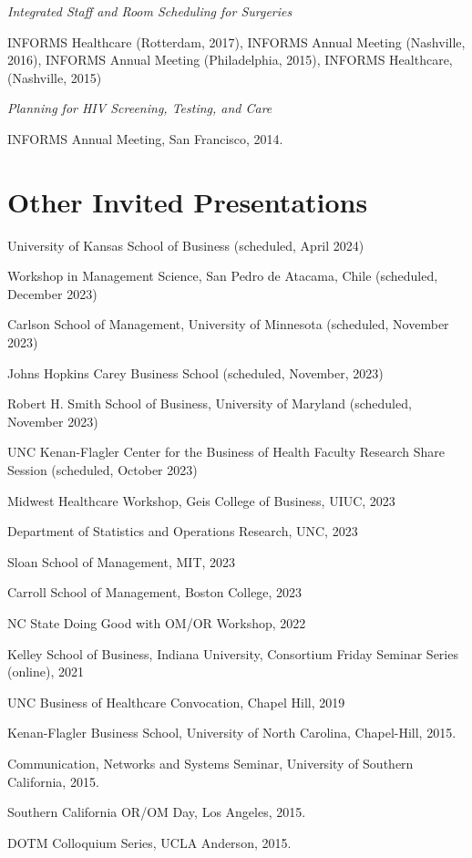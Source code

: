 \documentclass[11pt,a4paper]{article}
\renewenvironment{itemize}{
	\begin{list}{}{
			\setlength{\leftmargin}{1.5em}
		}
	}{
\end{list}
}
\begin{document}
\begin{itemize}
\begin{itemize}
		\end{itemize}
		\item \emph{Integrated Staff and Room Scheduling for Surgeries}
		\begin{itemize}
			\item INFORMS Healthcare (Rotterdam, 2017), INFORMS Annual Meeting (Nashville, 2016), INFORMS Annual Meeting (Philadelphia, 2015), INFORMS Healthcare, (Nashville, 2015)
		\end{itemize}
		\item \emph{Planning for HIV Screening, Testing, and Care}
		\begin{itemize}
			\item INFORMS Annual Meeting, San Francisco, 2014.
		\end{itemize}
	\end{itemize}
	\section*{\textbf{Other Invited Presentations}}


	\begin{itemize}

		\item University of Kansas School of Business (scheduled, April 2024)
		\item Workshop in Management Science, San Pedro de Atacama, Chile (scheduled, December 2023)
		\item Carlson School of Management, University of Minnesota (scheduled, November 2023)
		\item Johns Hopkins Carey Business School (scheduled, November, 2023)
		\item Robert H. Smith School of Business, University of Maryland (scheduled, November 2023)
		\item UNC Kenan-Flagler Center for the Business of Health Faculty Research Share Session (scheduled, October 2023)
		\item Midwest Healthcare Workshop, Geis College of Business, UIUC, 2023
		\item Department of Statistics and Operations Research, UNC, 2023
		\item Sloan School of Management, MIT, 2023
		\item Carroll School of Management, Boston College, 2023 
		\item NC State Doing Good with OM/OR Workshop, 2022
		\item Kelley School of Business, Indiana University, Consortium Friday Seminar Series (online), 2021
		\item UNC Business of Healthcare Convocation, Chapel Hill, 2019
		\item Kenan-Flagler Business School, University of North Carolina, Chapel-Hill, 2015.
		\item Communication, Networks and Systems Seminar, University of Southern California, 2015.
		\item Southern California OR/OM Day, Los Angeles, 2015.
		\item DOTM Colloquium Series, UCLA Anderson, 2015.
	
			

\end{itemize}
\end{document}

